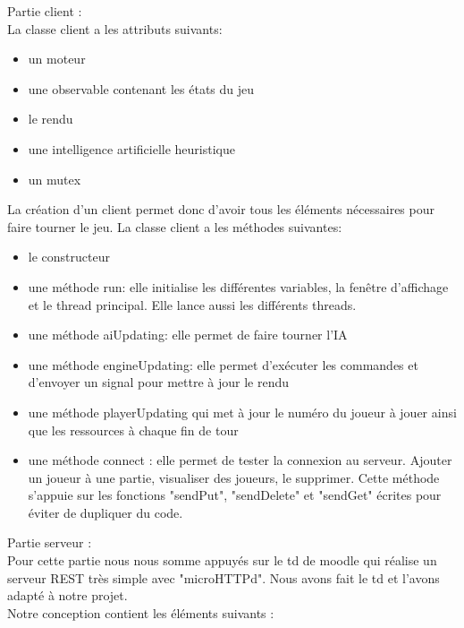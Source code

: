 \documentclass[12pt,a4paper]{article}
\begin{document}
Partie client : \\
La classe client a les attributs suivants:
\begin{itemize}
    \item un moteur
    \item une observable contenant les états du jeu
    \item le rendu
    \item une intelligence artificielle heuristique
    \item un mutex
\end{itemize}
La création d'un client permet donc d'avoir tous les éléments nécessaires pour faire tourner le jeu. 
La classe client a les méthodes suivantes:
\begin{itemize}
    \item le constructeur
    \item une méthode run: elle initialise les différentes variables, la fenêtre d'affichage et le thread principal. Elle lance aussi les différents threads.
    \item une méthode aiUpdating: elle permet de faire tourner l'IA 
    \item une méthode engineUpdating: elle permet d'exécuter les commandes et d'envoyer un signal pour mettre à jour le rendu
    \item une méthode playerUpdating qui met à jour le numéro du joueur à jouer ainsi que les ressources à chaque fin de tour
    \item une méthode connect : elle permet de tester la connexion au serveur. Ajouter un joueur à une partie, visualiser des joueurs, le supprimer. Cette méthode s'appuie sur les fonctions "sendPut", "sendDelete" et "sendGet" écrites pour éviter de dupliquer du code.
\end{itemize}

\newpage
Partie serveur : \\
Pour cette partie nous nous somme appuyés sur le td de moodle qui réalise un serveur REST très simple avec "microHTTPd". Nous avons fait le td et l'avons adapté à notre projet. \\Notre conception contient les éléments suivants : 
\end{document}
